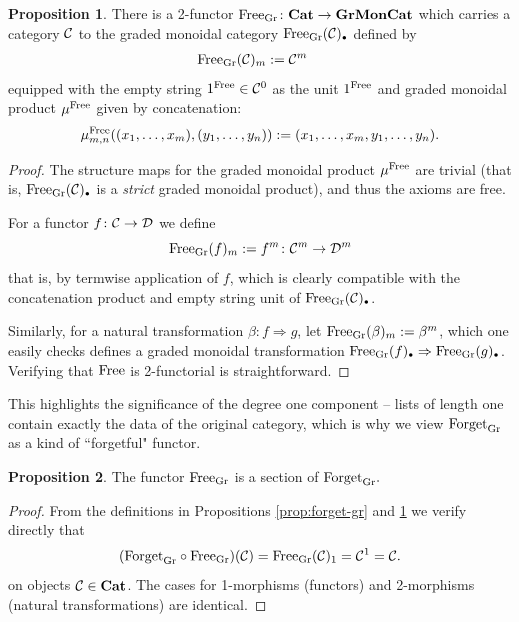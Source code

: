 \documentclass[openany, amssymb, psamsfonts]{amsart}
\theoremstyle{definition}
\newtheorem{prop}{Proposition}[section]
\numberwithin{equation}{section}
\begin{document}
\begin{prop} \label{prop:free-gr}
There is a 2-functor $\mathrm{Free}_{\mathrm{Gr}} \colon \textbf{\textup{Cat}} \to \textbf{\textup{GrMonCat}}$ which carries a category $\mathcal{C}$ to the graded monoidal category $\Free_\Gr(\C)_\sbull$ defined by
\begin{align*}
    \mathrm{Free}_{\mathrm{Gr}}(\mathcal{C})_m &:= \mathcal{C}^m
\end{align*} equipped with the empty string $1^{\mathrm{Free}} \in \mathcal{C}^0$ as the unit $1^{\mathrm{Free}}$ and graded monoidal product $\mu^{\mathrm{Free}}$ given by concatenation:
\begin{equation*}
    \mu^{\mathrm{Free}}_{m, n}((x_1, \dots, x_m), (y_1, \dots, y_n)) := (x_1, \dots, x_m, y_1, \dots, y_n).
\end{equation*}
\end{prop}

\begin{proof}
The structure maps for the graded monoidal product $\mu^{\mathrm{Free}}$ are trivial (that is, $\Free_\Gr(\C)_\sbull$ is a \emph{strict} graded monoidal product), and thus the axioms are free.

For a functor $f \colon \mathcal{C} \to \mathcal{D}$ we define 
$$
\mathrm{Free}_{\mathrm{Gr}}(f)_m := f^m \colon \mathcal{C}^m \to \mathcal{D}^m
$$that is, by termwise application of $f$, which is clearly compatible with the concatenation product and empty string unit of $\Free_\Gr(\C)_\sbull$. 

Similarly, for a natural transformation $\beta \colon f \Rightarrow g$, let $\mathrm{Free}_{\mathrm{Gr}}(\beta)_m := \beta^m$, which one easily checks defines a graded monoidal transformation $\Free_\Gr(f)_\sbull \Rightarrow \Free_\Gr(g)_\sbull$. Verifying that $\mathrm{Free}$ is 2-functorial is straightforward.
\end{proof}

This highlights the significance of the degree one component -- lists of length one contain exactly the data of the original category, which is why we view $\mathrm{Forget}_{\mathrm{Gr}}$ as a kind of ``forgetful" functor.

\begin{prop} \label{prop:free-forget-gr-section}
    The functor $\mathrm{Free}_{\mathrm{Gr}}$ is a section of $\mathrm{Forget}_{\mathrm{Gr}}.$
\end{prop}
\begin{proof}
From the definitions in Propositions \ref{prop:forget-gr} and \ref{prop:free-gr} we verify directly that
\begin{equation*}
    (\mathrm{Forget}_{\mathrm{Gr}} \circ \mathrm{Free}_{\mathrm{Gr}} )(\mathcal{C}) = \mathrm{Free}_{\mathrm{Gr}}(\mathcal{C})_1 = \mathcal{C}^1 = \mathcal{C}.
\end{equation*} on objects $\mathcal{C} \in \textbf{\textup{Cat}}$. The cases for 1-morphisms (functors) and 2-morphisms (natural transformations) are identical.
\end{proof}
\end{document}
